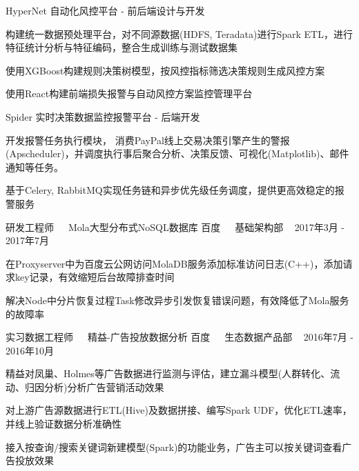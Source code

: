 \documentclass[11pt, a4paper, UTF8]{awesome-cv}
\begin{document}
\begin{cventries}
  \cventry
    {HyperNet 自动化风控平台 - 前后端设计与开发} %
    {} %
    {} %
    {\ } %
    {
      \begin{cvitems} %
        \item {构建统一数据预处理平台，对不同源数据(HDFS, Teradata)进行Spark ETL，进行特征统计分析与特征编码，整合生成训练与测试数据集}
        \item {使用XGBoost构建规则决策树模型，按风控指标筛选决策规则生成风控方案}
        \item {使用React构建前端损失报警与自动风控方案监控管理平台}
      \end{cvitems}
    }

  \cventry
    {Spider 实时决策数据监控报警平台 - 后端开发} %
    {} %
    {} %
    {\ } %
    {
      \begin{cvitems} %
        \item {开发报警任务执行模块， 消费PayPal线上交易决策引擎产生的警报(Apscheduler)，并调度执行事后聚合分析、决策反馈、可视化(Matplotlib)、邮件通知等任务。}
        \item {基于Celery, RabbitMQ实现任务链和异步优先级任务调度，提供更高效稳定的报警服务}
      \end{cvitems}
    }
    
  \cventry
    {研发工程师{\ \cdotp\ \ }Mola大型分布式NoSQL数据库} %
    {百度{\ \cdotp\ \ }基础架构部} %
    {\ } %
    {2017年3月 - 2017年7月} %
    {
      \begin{cvitems} %
        \item {在Proxyserver中为百度云公网访问MolaDB服务添加标准访问日志(C++)，添加请求key记录，有效缩短后台故障排查时间}
        \item {解决Node中分片恢复过程Task修改异步引发恢复错误问题，有效降低了Mola服务的故障率}
      \end{cvitems}
    }

  \cventry
    {实习数据工程师{\ \cdotp\ \ }精益-广告投放数据分析} %
    {百度{\ \cdotp\ \ }生态数据产品部} %
    {\ } %
    {2016年7月 - 2016年10月} %
    {
      \begin{cvitems} %
        \item {精益对凤巢、Holmes等广告数据进行监测与评估，建立漏斗模型(人群转化、流动、归因分析)分析广告营销活动效果}
        \item {对上游广告源数据进行ETL(Hive)及数据拼接、编写Spark UDF，优化ETL速率，并线上验证数据分析准确性}
        \item {接入按查询/搜索关键词新建模型(Spark)的功能业务，广告主可以按关键词查看广告投放效果}
      \end{cvitems}
    }
        

\end{cventries}
\end{document}

